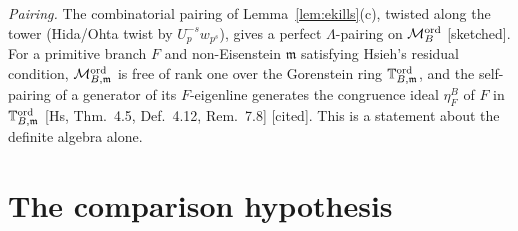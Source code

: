 \documentclass[11pt]{amsart}
\theoremstyle{plain}
\theoremstyle{definition}
\theoremstyle{remark}
\newcommand{\status}[1]{\textup{\textsf{[#1]}}}
\newcommand{\stcited}{\status{cited}}
\newcommand{\stsketch}{\status{sketched}}
\newcommand{\T}{\mathbb{T}}\newcommand{\m}{\mathfrak{m}}\newcommand{\cT}{\mathcal{T}}\newcommand{\cX}{\mathcal{X}}
\newcommand{\cM}{\mathcal{M}}\newcommand{\Frac}{\mathrm{Frac}}\newcommand{\tq}{\mathfrak{t}}\newcommand{\cc}{\mathfrak{c}}
\begin{document}
\emph{Pairing.} The combinatorial pairing of Lemma~\ref{lem:ekills}(c), twisted along the tower (Hida/Ohta twist by $U_p^{-s}w_{p^s}$), gives a perfect $\Lambda$-pairing on $\cM^{\rm ord}_B$ \stsketch. For a primitive branch $F$ and non-Eisenstein $\m$ satisfying Hsieh's residual condition, $\cM^{\rm ord}_{B,\m}$ is free of rank one over the Gorenstein ring $\T^{\rm ord}_{B,\m}$, and the self-pairing of a generator of its $F$-eigenline generates the congruence ideal $\eta^B_F$ of $F$ in $\T^{\rm ord}_{B,\m}$ [Hs, Thm.~4.5, Def.~4.12, Rem.~7.8] \stcited. This is a statement about the definite algebra alone.

\section{The comparison hypothesis}\label{sec:hypx}
\end{document}
